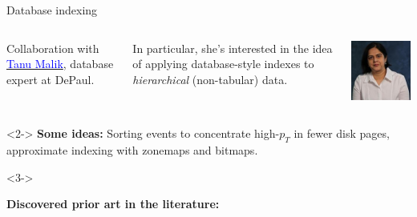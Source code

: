 \documentclass{beamer}
\begin{document}
\begin{frame}{Database indexing}
\vspace{0.5 cm}
\begin{columns}[c]
Collaboration with \href{http://www.cdm.depaul.edu/about/Pages/People/facultyinfo.aspx?fid=1328}{\textcolor{blue}{Tanu Malik}}, database expert at DePaul.

\vspace{0.2 cm}
In particular, she's interested in the idea of applying database-style indexes to {\it hierarchical} (non-tabular) data.

\includegraphics[width=\linewidth]{tanu.jpg}
\end{columns}

\vspace{0.2 cm}
\begin{uncoverenv}<2->
{\bf Some ideas:}
Sorting events to concentrate high-$p_T$ in fewer disk pages, approximate indexing with zonemaps and bitmaps.
\end{uncoverenv}

\vspace{0.35 cm}
\begin{uncoverenv}<3->
\begin{minipage}{\linewidth}
{\bf Discovered prior art in the literature:}


\end{minipage}
\end{uncoverenv}
\end{frame}
\end{document}
